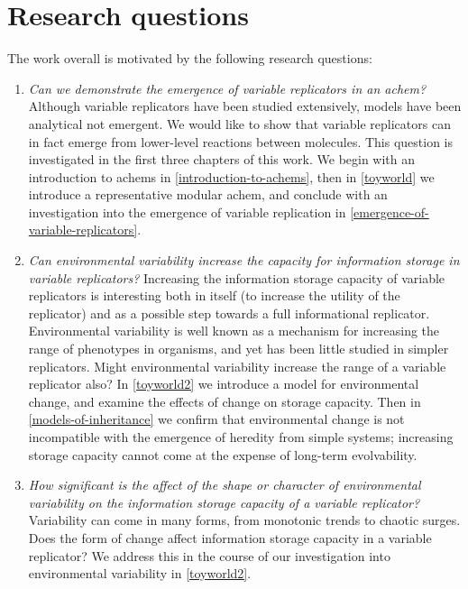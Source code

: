 \section{Research questions}\label{research-questions}

The work overall is motivated by the following research questions:

\vspace{0.3cm}
\begin{minipage}[l]{0.95\textwidth}
	\begin{enumerate}[label=RQ\arabic*:]
		\item \emph{Can we demonstrate the emergence of variable replicators in an \gls{achem}?} Although variable replicators have been studied extensively, models have been analytical not emergent. We would like to show that variable replicators can in fact emerge from lower-level reactions between molecules. This question is investigated in the first three chapters of this work. We begin with an introduction to \glspl{achem} in \cref{introduction-to-achems}, then in \cref{toyworld} we introduce a representative modular \gls{achem}, and conclude with an investigation into the emergence of variable replication in \cref{emergence-of-variable-replicators}.
		\item \emph{Can environmental variability increase the capacity for information storage in variable replicators?} Increasing the information storage capacity of variable replicators is interesting both in itself (to increase the utility of the replicator) and as a possible step towards a full informational replicator. Environmental variability is well known as a mechanism for increasing the range of phenotypes in organisms, and yet has been little studied in simpler replicators. Might environmental variability increase the range of a variable replicator also? In \cref{toyworld2} we introduce a model for environmental change, and examine the effects of change on storage capacity. Then in \cref{models-of-inheritance} we confirm that environmental change is not incompatible with the emergence of heredity from simple systems; increasing storage capacity cannot come at the expense of long-term evolvability.
		\item \emph{How significant is the affect of the shape or character of environmental variability on the information storage capacity of a variable replicator?} Variability can come in many forms, from monotonic trends to chaotic surges. Does the form of change affect information storage capacity in a variable replicator? We address this in the course of our investigation into environmental variability in \cref{toyworld2}.
	\end{enumerate}
\end{minipage}
\vspace{0.3cm}

